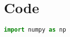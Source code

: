 % 
\chapter{Code}
\label{ch:Code}

\begin{lstlisting}[caption={Caption on PDF}, label={lst:reference_this}, language=Python]
import numpy as np
\end{lstlisting}